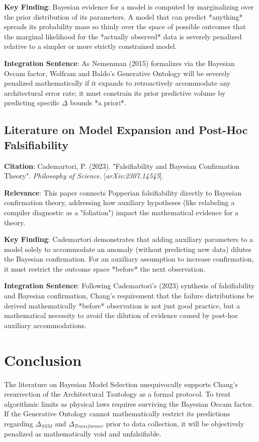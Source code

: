 \documentclass{article}
\begin{document}
\textbf{Key Finding}: Bayesian evidence for a model is computed by marginalizing over the prior distribution of its parameters. A model that can predict *anything* spreads its probability mass so thinly over the space of possible outcomes that the marginal likelihood for the *actually observed* data is severely penalized relative to a simpler or more strictly constrained model.

\textbf{Integration Sentence}: As Nemenman (2015) formalizes via the Bayesian Occam factor, Wolfram and Baldo's Generative Ontology will be severely penalized mathematically if it expands to retroactively accommodate any architectural error rate; it must constrain its prior predictive volume by predicting specific $\Delta$ bounds *a priori*.

\subsection{Literature on Model Expansion and Post-Hoc Falsifiability}
\textbf{Citation}: Cademartori, P. (2023). "Falsifiability and Bayesian Confirmation Theory". \textit{Philosophy of Science}. [\textit{arXiv:2307.14545}].

\textbf{Relevance}: This paper connects Popperian falsifiability directly to Bayesian confirmation theory, addressing how auxiliary hypotheses (like relabeling a compiler diagnostic as a "foliation") impact the mathematical evidence for a theory.

\textbf{Key Finding}: Cademartori demonstrates that adding auxiliary parameters to a model solely to accommodate an anomaly (without predicting new data) dilutes the Bayesian confirmation. For an auxiliary assumption to increase confirmation, it must restrict the outcome space *before* the next observation.

\textbf{Integration Sentence}: Following Cademartori's (2023) synthesis of falsifiability and Bayesian confirmation, Chang's requirement that the failure distributions be derived mathematically *before* observation is not just good practice, but a mathematical necessity to avoid the dilution of evidence caused by post-hoc auxiliary accommodations.

\section{Conclusion}
The literature on Bayesian Model Selection unequivocally supports Chang's resurrection of the Architectural Tautology as a formal protocol. To treat algorithmic limits as physical laws requires surviving the Bayesian Occam factor. If the Generative Ontology cannot mathematically restrict its predictions regarding $\Delta_{SSM}$ and $\Delta_{Transformer}$ prior to data collection, it will be objectively penalized as mathematically void and unfalsifiable.
\end{document}
